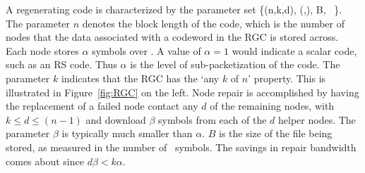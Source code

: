 \begin{multicols}{2}
	A regenerating code is characterized by the parameter set
	\bean
	\{(n,k,d), (\alpha,\beta), B, \fq\ \}.
	\eean
	The parameter $n$ denotes the block length of the code, which is the number of nodes that the data associated with a codeword in the RGC is stored across. Each node stores $\alpha$ symbols over \fq.  A value of $\alpha=1$ would indicate a scalar code, such as an RS code.  Thus $\alpha$ is the level of sub-packetization of the code. The parameter $k$ indicates that the RGC has the `any $k$ of $n$' property.  This is illustrated in Figure~\ref{fig:RGC} on the left. Node repair is accomplished by having the replacement of a failed node contact any $d$ of the remaining nodes, with $k \leq d \leq (n-1)$ and download $\beta$ symbols from each of the $d$ helper nodes.  The parameter $\beta$ is typically much smaller than $\alpha$.  $B$ is the size of the file being stored, as measured in the number of \fq\ symbols.  The savings in repair bandwidth comes about since $d \beta < k \alpha $.
 \end{multicols}

